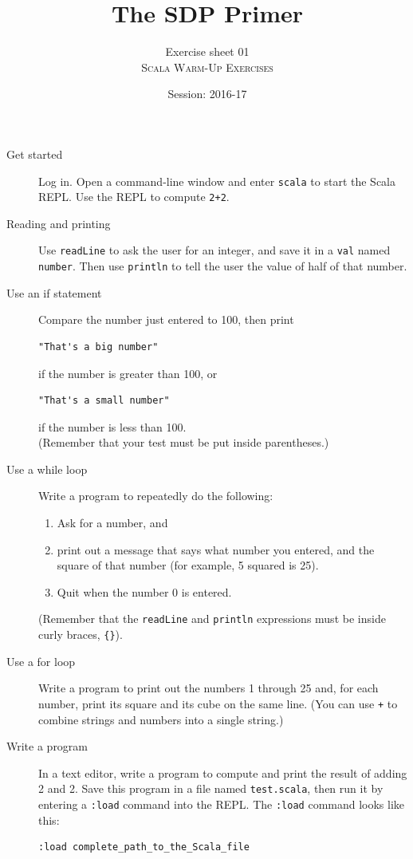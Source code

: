 \documentclass[12pt,a4paper,times]{article}
\title{The SDP Primer}
\author{Exercise sheet 01\\[2mm]
\textsc{Scala Warm-Up Exercises}}
\date{Session: 2016-17}
\begin{document}
\maketitle
\thispagestyle{fancy}

\begin{description}

\item[Get started] Log in. Open a command-line window and enter \verb!scala! to start the Scala REPL. 
Use the REPL to compute \verb!2+2!.

\item[Reading and printing] Use \verb!readLine! to ask the user for an integer, 
and save it in a \verb!val! named \verb!number!. Then use \verb!println! to tell the user the 
value of half of that number.

\item[Use an if statement] Compare the number just entered to 100, then print
\begin{Verbatim}
"That's a big number"
\end{Verbatim} 
if the number is greater than 100, or 
\begin{Verbatim}
"That's a small number" 
\end{Verbatim}
if the number is less than 100. \\
(Remember that your test must be put inside parentheses.)

\item[Use a while loop] Write a program to repeatedly do the following: 
\begin{enumerate}
\item Ask for a number, and 
\item print out a message that says what number you entered, and the square of that number 
(for example, 5 squared is 25). 
\item Quit when the number 0 is entered. 
\end{enumerate} 
(Remember that the \verb!readLine! and \verb!println! expressions must be inside curly braces, \verb!{}!).

\item[Use a for loop] Write a program to print out the numbers 1 through 25 and, for each number, 
print its square and its cube on the same line. 
(You can use \verb!+! to combine strings and numbers into a single string.)

\item[Write a program] In a text editor, write a program to compute and print the result of adding 2 and 2. 
Save this program  in a file named \verb!test.scala!, then run it by entering a \verb!:load! 
command into the REPL. The \verb!:load! command looks like this:
\begin{Verbatim}
:load complete_path_to_the_Scala_file
\end{Verbatim}


\end{description}
\end{document}
